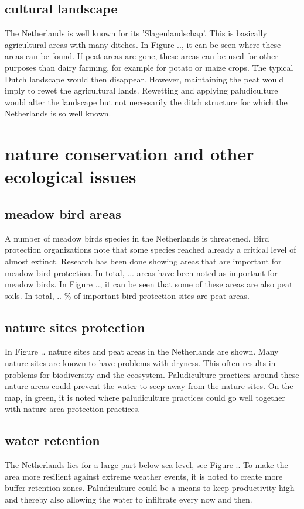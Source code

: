 \documentclass[a4paper,12pt]{scrbook}
\begin{document}
\subsection{cultural landscape}
The Netherlands is well known for its 'Slagenlandschap'. This is basically agricultural areas with many ditches. In Figure .., it can be seen where these areas can be found. If peat areas are gone, these areas can be used for other purposes than dairy farming, for example for potato or maize crops. The typical Dutch landscape would then disappear. However, maintaining the peat would imply to rewet the agricultural lands. Rewetting and applying paludiculture would alter the landscape but not necessarily the ditch structure for which the Netherlands is so well known. 

\section{nature conservation and other ecological issues}

\subsection{meadow bird areas}
A number of meadow birds species in the Netherlands is threatened. Bird protection organizations note that some species reached already a critical level of almost extinct. Research has been done showing areas that are important for meadow bird protection. In total, ... areas have been noted as important for meadow birds. In Figure .., it can be seen that some of these areas are also peat soils. In total, .. \% of important bird protection sites are peat areas. 

\subsection{nature sites protection}
In Figure .. nature sites and peat areas in the Netherlands are shown. Many nature sites are known to have problems with dryness. This often results in problems for biodiversity and the ecosystem. Paludiculture practices around these nature areas could prevent the water to seep away from the nature sites. On the map, in green, it is noted where paludiculture practices could go well together with nature area protection practices.

\subsection{water retention}
The Netherlands lies for a large part below sea level, see Figure .. To make the area more resilient against extreme weather events, it is noted to create more buffer retention zones. Paludiculture could be a means to keep productivity high and thereby also allowing the water to infiltrate every now and then. 
\end{document}

